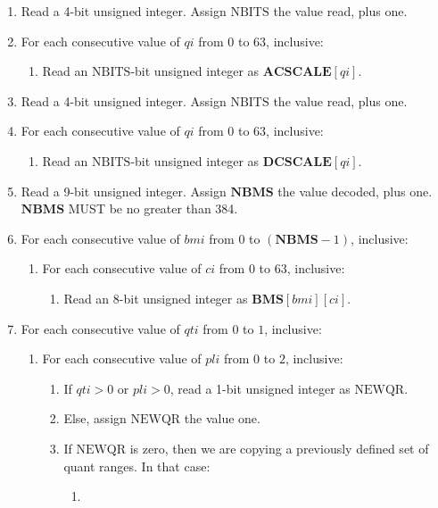 \documentclass[9pt,letterpaper]{book}
\newcommand{\idx}[1]{{\ensuremath{\mathit{#1}}}}
\newcommand{\qti}{\idx{qti}}
\newcommand{\pli}{\idx{pli}}
\newcommand{\qi}{\idx{qi}}
\newcommand{\ci}{\idx{ci}}
\newcommand{\bmi}{\idx{bmi}}
\newcommand{\bitvar}[1]{\ensuremath{\mathbf{\bm{#1}}}}
\newcommand{\locvar}[1]{\ensuremath{\mathrm{#1}}}
\numberwithin{equation}{chapter}
\numberwithin{figure}{chapter}
\numberwithin{table}{chapter}
\begin{document}
\begin{enumerate}
\item
Read a 4-bit unsigned integer.
Assign \locvar{NBITS} the value read, plus one.
\item
For each consecutive value of \locvar{\qi} from $0$ to $63$, inclusive:
\begin{enumerate}
\item
Read an \locvar{NBITS}-bit unsigned integer as
 $\bitvar{ACSCALE}[\locvar{\qi}]$.
\end{enumerate}
\item
Read a 4-bit unsigned integer.
Assign \locvar{NBITS} the value read, plus one.
\item
For each consecutive value of \locvar{\qi} from $0$ to $63$, inclusive:
\begin{enumerate}
\item
Read an \locvar{NBITS}-bit unsigned integer as
 $\bitvar{DCSCALE}[\locvar{\qi}]$.
\end{enumerate}
\item
Read a 9-bit unsigned integer.
Assign \bitvar{NBMS} the value decoded, plus one.
\bitvar{NBMS} MUST be no greater than 384.
\item
For each consecutive value of \locvar{\bmi} from $0$ to $(\bitvar{NBMS}-1)$,
 inclusive:
\begin{enumerate}
\item
For each consecutive value of \locvar{\ci} from $0$ to $63$, inclusive:
\begin{enumerate}
\item
Read an 8-bit unsigned integer as $\bitvar{BMS}[\locvar{\bmi}][\locvar{\ci}]$.
\end{enumerate}
\end{enumerate}
\item
For each consecutive value of \locvar{\qti} from $0$ to $1$, inclusive:
\begin{enumerate}
\item
For each consecutive value of \locvar{\pli} from $0$ to $2$, inclusive:
\begin{enumerate}
\item
If $\locvar{\qti}>0$ or $\locvar{\pli}>0$, read a 1-bit unsigned integer as
 \locvar{NEWQR}.
\item
Else, assign \locvar{NEWQR} the value one.
\item
If \locvar{NEWQR} is zero, then we are copying a previously defined set of
 quant ranges.
In that case:
\begin{enumerate}
\item

\end{enumerate}
\end{enumerate}
\end{enumerate}
\end{enumerate}
\end{document}
